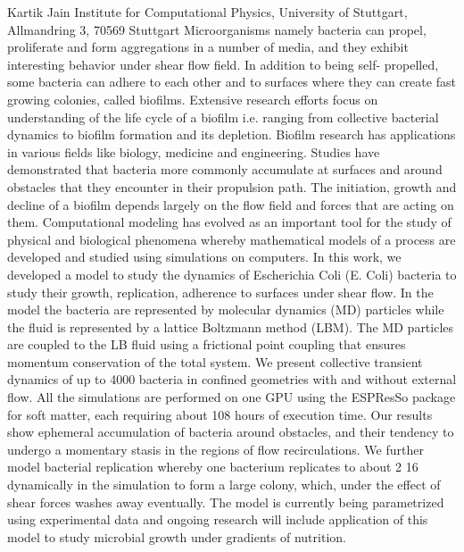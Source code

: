 \documentclass{article}
\begin{document}
{Kartik Jain}
{Institute for Computational Physics, University of Stuttgart, Allmandring 3, 70569 Stuttgart}
{Microorganisms namely bacteria can propel, proliferate and form aggregations in a number
of media, and they exhibit interesting behavior under shear flow field. In addition to being self-
propelled, some bacteria can adhere to each other and to surfaces where they can create fast
growing colonies, called biofilms. Extensive research efforts focus on understanding of the life cycle
of a biofilm i.e. ranging from collective bacterial dynamics to biofilm formation and its depletion.
Biofilm research has applications in various fields like biology, medicine and engineering. Studies
have demonstrated that bacteria more commonly accumulate at surfaces and around obstacles that
they encounter in their propulsion path. The initiation, growth and decline of a biofilm depends
largely on the flow field and forces that are acting on them.
Computational modeling has evolved as an important tool for the study of physical and biological
phenomena whereby mathematical models of a process are developed and studied using simulations
on computers. In this work, we developed a model to study the dynamics of Escherichia Coli
(E. Coli) bacteria to study their growth, replication, adherence to surfaces under shear flow. In
the model the bacteria are represented by molecular dynamics (MD) particles while the fluid is
represented by a lattice Boltzmann method (LBM). The MD particles are coupled to the LB
fluid using a frictional point coupling that ensures momentum conservation of the total system.
We present collective transient dynamics of up to 4000 bacteria in confined geometries with and
without external flow. All the simulations are performed on one GPU using the ESPResSo package
for soft matter, each requiring about 108 hours of execution time. Our results show ephemeral
accumulation of bacteria around obstacles, and their tendency to undergo a momentary stasis in
the regions of flow recirculations. We further model bacterial replication whereby one bacterium
replicates to about 2 16 dynamically in the simulation to form a large colony, which, under the
effect of shear forces washes away eventually. The model is currently being parametrized using
experimental data and ongoing research will include application of this model to study microbial
growth under gradients of nutrition.}
\end{document}
